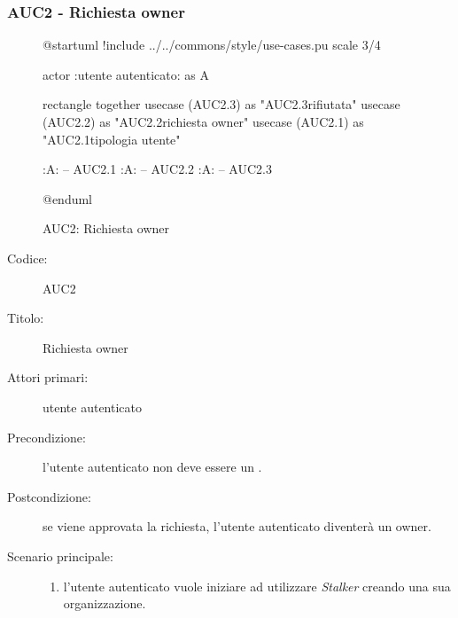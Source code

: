 \documentclass[casi-duso]{subfiles}
\begin{document}
\subsubsection{AUC2 - Richiesta owner}%
\label{subsub:AUC2}

\begin{figure}[h!]
  \centering
  \begin{plantuml}
  @startuml
  !include ../../commons/style/use-cases.pu
  scale 3/4

  actor :utente autenticato: as A

  rectangle {
    together {
      usecase (AUC2.3) as "AUC2.3\nRichiesta rifiutata"
      usecase (AUC2.2) as "AUC2.2\nInvio richiesta owner"
      usecase (AUC2.1) as "AUC2.1\nVerifica tipologia utente"
    }
  }

  :A: -- AUC2.1
  :A: -- AUC2.2
  :A: -- AUC2.3

  @enduml
  \end{plantuml}
  \caption{AUC2: Richiesta owner}
  \label{fig:auc2}
\end{figure}

\begin{description}
  \item[Codice:] AUC2
  \item[Titolo:] Richiesta owner
  \item[Attori primari:] utente autenticato
  \item[Precondizione:] l'utente autenticato non deve essere un .
  \item[Postcondizione:] se viene approvata la richiesta, l'utente autenticato diventerà un owner.
  \item[Scenario principale:]
  \begin{enumerate}
    \item l'utente autenticato vuole iniziare ad utilizzare \emph{Stalker} creando una sua organizzazione.
  \end{enumerate}
\end{description}
\end{document}
